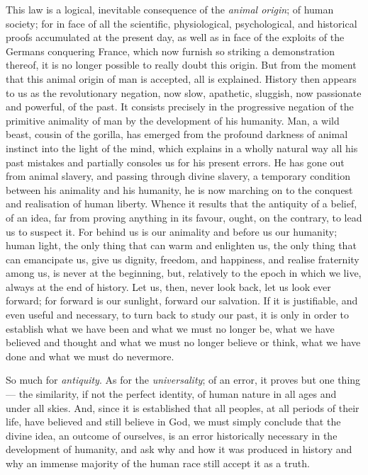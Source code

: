 \documentclass[12pt]{report}
\begin{document}
This law is a logical, inevitable consequence of the \emph{animal origin}; of human society; for in face of all the scientific, physiological, psychological, and historical proofs accumulated at the present day, as well as in face of the exploits of the Germans conquering France, which now furnish so striking a demonstration thereof, it is no longer possible to really doubt this origin. But from the moment that this animal origin of man is accepted, all is explained. History then appears to us as the revolutionary negation, now slow, apathetic, sluggish, now passionate and powerful, of the past. It consists precisely in the progressive negation of the primitive animality of man by the development of his humanity. Man, a wild beast, cousin of the gorilla, has emerged from the profound darkness of animal instinct into the light of the mind, which explains in a wholly natural way all his past mistakes and partially consoles us for his present errors. He has gone out from animal slavery, and passing through divine slavery, a temporary condition between his animality and his humanity, he is now marching on to the conquest and realisation of human liberty. Whence it results that the antiquity of a belief, of an idea, far from proving anything in its favour, ought, on the contrary, to lead us to suspect it. For behind us is our animality and before us our humanity; human light, the only thing that can warm and enlighten us, the only thing that can emancipate us, give us dignity, freedom, and happiness, and realise fraternity among us, is never at the beginning, but, relatively to the epoch in which we live, always at the end of history. Let us, then, never look back, let us look ever forward; for forward is our sunlight, forward our salvation. If it is justifiable, and even useful and necessary, to turn back to study our past, it is only in order to establish what we have been and what we must no longer be, what we have believed and thought and what we must no longer believe or think, what we have done and what we must do nevermore.


So much for \emph{antiquity}. As for the \emph{universality}; of an error, it proves but one thing — the similarity, if not the perfect identity, of human nature in all ages and under all skies. And, since it is established that all peoples, at all periods of their life, have believed and still believe in God, we must simply conclude that the divine idea, an outcome of ourselves, is an error historically necessary in the development of humanity, and ask why and how it was produced in history and why an immense majority of the human race still accept it as a truth.
\end{document}
